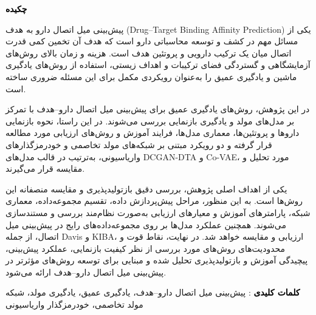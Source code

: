 \thispagestyle{empty}

\vspace{-2cm}
\begin{center}
\textbf{\large \textcolor{black}{چکیده} }
\end{center}

پیش‌بینی میل اتصال دارو به هدف (Drug–Target Binding Affinity Prediction) یکی از مسائل مهم در کشف و توسعه محاسباتی دارو است که هدف آن تخمین کمی قدرت اتصال میان یک ترکیب دارویی و پروتئین هدف است. هزینه و زمان بالای روش‌های آزمایشگاهی و گستردگی فضای ترکیبات و اهداف زیستی، استفاده از روش‌های یادگیری ماشین و یادگیری عمیق را به‌عنوان رویکردی مکمل برای این مسئله ضروری ساخته است.

در این پژوهش، روش‌های یادگیری عمیق برای پیش‌بینی میل اتصال دارو–هدف با تمرکز بر مدل‌های مولد و یادگیری بازنمایی بررسی می‌شوند. در این راستا، نحوه بازنمایی داروها و پروتئین‌ها، معماری مدل‌ها، فرایند آموزش و روش‌های ارزیابی مورد مطالعه قرار گرفته و دو رویکرد مبتنی بر شبکه‌های مولد تخاصمی و خودرمزگذارهای واریاسیونی، به‌ترتیب در قالب مدل‌های DCGAN-DTA و Co-VAE، مورد تحلیل و مقایسه قرار می‌گیرند.

یکی از اهداف اصلی پژوهش، بررسی دقیق بازتولیدپذیری و مقایسه منصفانه این روش‌ها است. به این منظور، مراحل پیش‌پردازش داده، تقسیم مجموعه‌داده، معماری شبکه، پارامترهای آموزش و معیارهای ارزیابی به‌صورت نظام‌مند بررسی و مستندسازی می‌شوند. همچنین عملکرد مدل‌ها بر روی مجموعه‌داده‌های رایج در پیش‌بینی میل اتصال، از جمله Davis و KIBA، ارزیابی و مقایسه خواهد شد. در نهایت، نقاط قوت و محدودیت‌های روش‌های مورد بررسی از نظر کیفیت بازنمایی، عملکرد پیش‌بینی، پیچیدگی آموزش و بازتولیدپذیری تحلیل شده و مبنایی برای توسعه روش‌های مؤثرتر در پیش‌بینی میل اتصال دارو–هدف ارائه می‌شود.

\hspace{-0.65cm}%
\textbf{\textcolor{black}{کلمات کلیدی}} :
پیش‌بینی میل اتصال دارو–هدف، یادگیری عمیق، یادگیری مولد، شبکه مولد تخاصمی، خودرمزگذار واریاسیونی

\clearpage
